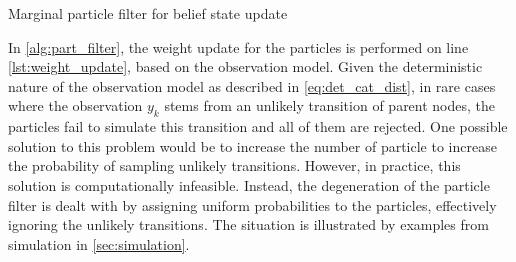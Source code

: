 \begin{algorithm}[H]
	
	\vspace{+4pt}
	\begin{algorithmic}[1]
		\\
		
		 \\
		 \label{lst:weight_update}
		\ENDFOR \\
		\\
		\\
		\ENDFOR 
	\end{algorithmic}
	\caption{Marginal particle filter for belief state update \cite{Studer2016}}
	\label{alg:part_filter}
\end{algorithm}
In \cref{alg:part_filter}, the weight update for the particles is performed on line \autoref{lst:weight_update}, based on the observation model. Given the deterministic nature of the observation model as described in \autoref{eq:det_cat_dist}, in rare cases where the observation $ y_k $ stems from an unlikely transition of parent nodes, the particles fail to simulate this transition and all of them are rejected. One possible solution to this problem would be to increase the number of particle to increase the probability of sampling unlikely transitions. However, in practice, this solution is computationally infeasible. Instead, the degeneration of the particle filter is dealt with by assigning uniform probabilities to the particles, effectively ignoring the unlikely transitions. The situation is illustrated by examples from simulation in \cref{sec:simulation}.

